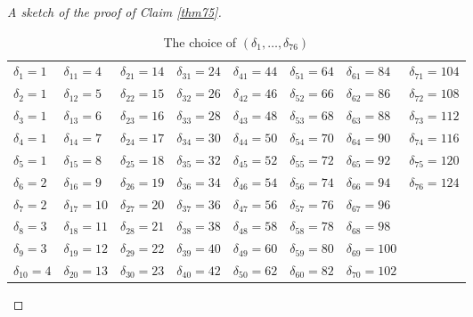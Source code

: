 \documentclass[12pt]{article}
\numberwithin{equation}{section}
\begin{document}
\begin{proof}[A sketch of the proof of Claim \ref{thm75}]
\begin{table}[htbp]
	\centering
	\caption{The choice of $(\delta_1,\ldots,\delta_{76})$}
	\label{table2}
	\begin{tabular}{|llllllll|}
		\hline
		$\delta_1=1$ & $\delta_{11}=4$ & $\delta_{21}=14$ & $\delta_{31}=24$ & $\delta_{41}=44$ & $\delta_{51}=64$ & $\delta_{61}=84$ & $\delta_{71}=104$  \\
		$\delta_2=1$ & $\delta_{12}=5$ & $\delta_{22}=15$ &  $\delta_{32}=26$ & $\delta_{42}=46$ & $\delta_{52}=66$ & $\delta_{62}=86$ & $\delta_{72}=108$ \\
		$\delta_3=1$ & $\delta_{13}=6$ & $\delta_{23}=16$ & $\delta_{33}=28$ & $\delta_{43}=48$ & $\delta_{53}=68$ & $\delta_{63}=88$ & $\delta_{73}=112$ \\
		$\delta_4=1$ & $\delta_{14}=7$ & $\delta_{24}=17$ & $\delta_{34}=30$ & $\delta_{44}=50$ & $\delta_{54}=70$ & $\delta_{64}=90$ & $\delta_{74}=116$ \\
		$\delta_5=1$ & $\delta_{15}=8$ & $\delta_{25}=18$ & $\delta_{35}=32$ & $\delta_{45}=52$ & $\delta_{55}=72$ & $\delta_{65}=92$ & $\delta_{75}=120$ \\
		$\delta_6=2$ & $\delta_{16}=9$ & $\delta_{26}=19$ & $\delta_{36}=34$ & $\delta_{46}=54$ & $\delta_{56}=74$ & $\delta_{66}=94$ & $\delta_{76}=124$ \\
		$\delta_7=2$ & $\delta_{17}=10$ & $\delta_{27}=20$ & $\delta_{37}=36$ & $\delta_{47}=56$ & $\delta_{57}=76$ & $\delta_{67}=96$ &\\
		$\delta_8=3$ & $\delta_{18}=11$ & $\delta_{28}=21$ & $\delta_{38}=38$ & $\delta_{48}=58$ & $\delta_{58}=78$ & $\delta_{68}=98$ &\\
		$\delta_9=3$ & $\delta_{19}=12$ & $\delta_{29}=22$ & $\delta_{39}=40$ & $\delta_{49}=60$ & $\delta_{59}=80$ & $\delta_{69}=100$ &\\
		$\delta_{10}=4$ & $\delta_{20}=13$ & $\delta_{30}=23$ & $\delta_{40}=42$ & $\delta_{50}=62$ & $\delta_{60}=82$ & $\delta_{70}=102$ &\\
		\hline
	\end{tabular}
\end{table}


\end{proof}
\end{document}
